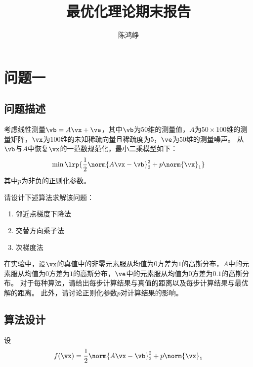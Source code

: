 \documentclass[logo,reportComp]{thesis}
\title{最优化理论期末报告}
\subtitle{}
\author{陈鸿峥}
\begin{document}
\maketitle

\section{问题一}
\subsection{问题描述}
考虑线性测量$\vb=A\vx+\ve$，其中$\vb$为$50$维的测量值，$A$为$50\times 100$维的测量矩阵，$\vx$为$100$维的未知稀疏向量且稀疏度为$5$，$\ve$为$50$维的测量噪声。
从$\vb$与$A$中恢复$\vx$的一范数规范化，最小二乘模型如下：
\[\min\lrp{\frac{1}{2}\norm{A\vx-\vb}_2^2+p\norm{\vx}_1}\]
其中$p$为非负的正则化参数。

请设计下述算法求解该问题：
\begin{enumerate}
    \item 邻近点梯度下降法
    \item 交替方向乘子法
    \item 次梯度法
\end{enumerate}

在实验中，设$\vx$的真值中的非零元素服从均值为$0$方差为$1$的高斯分布，$A$中的元素服从均值为$0$方差为$1$的高斯分布，$\ve$中的元素服从均值为$0$方差为$0.1$的高斯分布。
对于每种算法，请给出每步计算结果与真值的距离以及每步计算结果与最优解的距离。
此外，请讨论正则化参数$p$对计算结果的影响。

\subsection{算法设计}
设
\begin{equation}
f(\vx)=\frac{1}{2}\norm{A\vx-\vb}_2^2+p\norm{\vx}_1
\end{equation}
\end{document}

